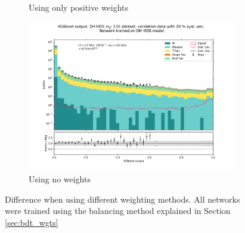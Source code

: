 \documentclass[12pt, a4paper]{book}
\begin{document}
\begin{figure}[!ht]
\begin{subfigure}[b]{0.49\textwidth}
      \caption{Using only positive weights}
   \end{subfigure}
   \begin{subfigure}[b]{0.49\textwidth}
      \centering
      \includegraphics[width=1\textwidth]{No_wgt/VAL.pdf}
      \caption{Using no weights}
   \end{subfigure}
   \caption[Difference when using different weighting methods on BDTs]{Difference when using different weighting methods. All networks were trained using the balancing method explained in Section \ref{sec:bdt_wgts}}\label{fig:BDT_wgts}
\end{figure}
\end{document}
